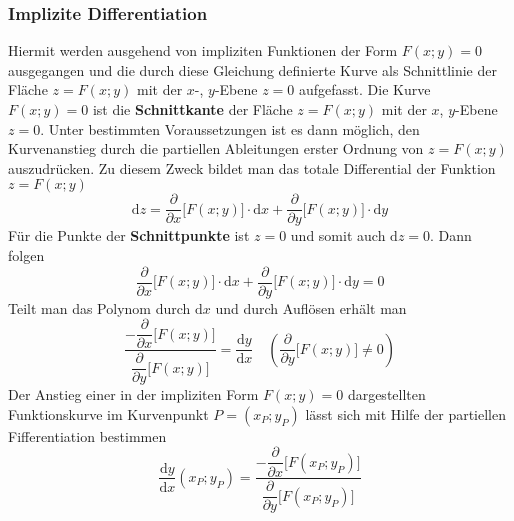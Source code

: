 \subsubsection{Implizite Differentiation}
Hiermit werden ausgehend von impliziten Funktionen der Form $F\left(x; y\right)=0$ ausgegangen und die durch diese Gleichung definierte Kurve als Schnittlinie der Fläche $z=F\left(x; y\right)$ mit der $x$-, $y$-Ebene $z=0$ aufgefasst. Die Kurve $F\left(x; y\right)=0$ ist die \textbf{Schnittkante} der Fläche $z=F\left(x; y\right)$ mit der $x$, $y$-Ebene $z=0$. 
\newline\newline
Unter bestimmten Voraussetzungen ist es dann möglich, den Kurvenanstieg durch die partiellen Ableitungen erster Ordnung von $z=F\left(x; y\right)$ auszudrücken. Zu diesem Zweck bildet man das totale Differential der Funktion $z=F\left(x; y\right)$
\begin{equation}
\boxed{\text{d}z=\dfrac{\partial}{\partial x}\Big[F\left(x; y\right)\Big]\cdot \text{d}x+\dfrac{\partial}{\partial y}\Big[F\left(x; y\right)\Big]\cdot \text{d}y}
\end{equation}
Für die Punkte der \textbf{Schnittpunkte} ist $z=0$ und somit auch $\text{d}z=0$. Dann folgen
\begin{equation}
\boxed{\dfrac{\partial}{\partial x}\Big[F\left(x; y\right)\Big]\cdot \text{d}x+\dfrac{\partial}{\partial y}\Big[F\left(x; y\right)\Big]\cdot \text{d}y=0}
\end{equation}
Teilt man das Polynom durch $\text{d}x$ und durch Auflösen erhält man
\begin{equation}
\boxed{\dfrac{-\dfrac{\partial}{\partial x}\Big[F\left(x; y\right)\Big]}{\dfrac{\partial}{\partial y}\Big[F\left(x; y\right)\Big]}=\dfrac{\text{d}y}{\text{d}x}\quad \left(\dfrac{\partial}{\partial y}\Big[F\left(x; y\right)\Big]\neq 0\right)}
\end{equation}
Der Anstieg einer in der impliziten Form $F\left(x; y\right)=0$ dargestellten Funktionskurve im Kurvenpunkt $P=\left(x_P; y_P\right)$ lässt sich mit Hilfe der partiellen Fifferentiation bestimmen
\begin{equation}
\boxed{\dfrac{\text{d}y}{\text{d}x}\left(x_P; y_P\right)=\dfrac{-\dfrac{\partial}{\partial x}\Big[F\left(x_P; y_P\right)\Big]}{\dfrac{\partial}{\partial y}\Big[F\left(x_P; y_P\right)\Big]}}
\end{equation}
